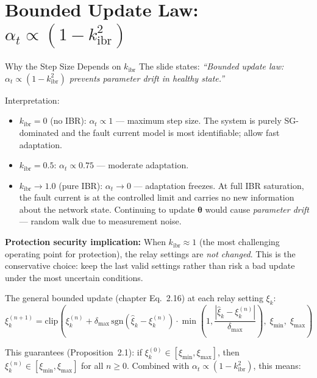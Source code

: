 \documentclass[12pt,a4paper]{article}
\newcommand{\kibr}{k_\mathrm{ibr}}
\begin{document}
\section{Bounded Update Law: $\alpha_t \propto (1-\kibr^2)$}

\begin{keybox}{Why the Step Size Depends on $\kibr$}
The slide states: \textit{``Bounded update law: $\alpha_t \propto (1 - \kibr^2)$
prevents parameter drift in healthy state.''}

Interpretation:
\begin{itemize}[nosep]
  \item $\kibr = 0$ (no IBR): $\alpha_t \propto 1$ --- maximum step size.  The
        system is purely SG-dominated and the fault current model is most
        identifiable; allow fast adaptation.
  \item $\kibr = 0.5$: $\alpha_t \propto 0.75$ --- moderate adaptation.
  \item $\kibr \to 1.0$ (pure IBR): $\alpha_t \to 0$ --- adaptation freezes.
        At full IBR saturation, the fault current is at the controlled limit and
        carries no new information about the network state.  Continuing to update
        $\bm{\theta}$ would cause \emph{parameter drift} --- random walk due to
        measurement noise.
\end{itemize}

\textbf{Protection security implication:} When $\kibr \approx 1$ (the most
challenging operating point for protection), the relay settings are \emph{not
changed}.  This is the conservative choice: keep the last valid settings rather
than risk a bad update under the most uncertain conditions.
\end{keybox}

The general bounded update (chapter Eq.~2.16) at each relay setting $\xi_k$:
\begin{equation}
  \xi_k^{(n+1)} = \mathrm{clip}\!\left(
    \xi_k^{(n)} + \delta_\mathrm{max}\,\mathrm{sgn}(\hat{\xi}_k - \xi_k^{(n)})
    \cdot \min\!\left(1, \frac{|\hat{\xi}_k - \xi_k^{(n)}|}{\delta_\mathrm{max}}\right),\;
    \xi_\mathrm{min},\; \xi_\mathrm{max}
  \right)
  \label{eq:bounded_update}
\end{equation}

This guarantees (Proposition~2.1): if $\xi_k^{(0)} \in [\xi_\mathrm{min},\xi_\mathrm{max}]$,
then $\xi_k^{(n)} \in [\xi_\mathrm{min},\xi_\mathrm{max}]$ for all $n \geq 0$.
Combined with $\alpha_t \propto (1-\kibr^2)$, this means:
\end{document}
